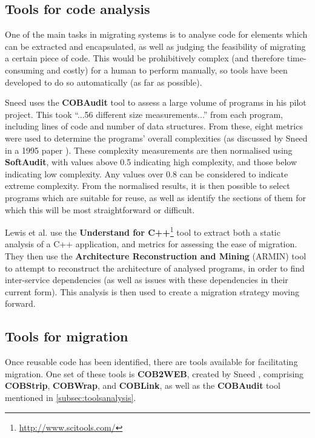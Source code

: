 \documentclass[12pt,journal,compsoc]{IEEEtran}
\begin{document}
\subsection{Tools for code analysis}
\label{subsec:toolsanalysis}
One of the main tasks in migrating systems is to analyse code for elements which can be extracted and encapsulated, as well as judging the feasibility of migrating a certain piece of code. This would be prohibitively complex (and therefore time-consuming and costly) for a human to perform manually, so tools have been developed to do so automatically (as far as possible).

Sneed \cite{Sneed2009} uses the \textbf{COBAudit} tool to assess a large volume of programs in his pilot project. This took ``...56 different size measurements...'' \cite{Sneed2009} from each program, including lines of code and number of data structures. From these, eight metrics were used to determine the programs' overall complexities (as discussed by Sneed in a 1995 paper \cite{Sneed1995}). These complexity measurements are then normalised using \textbf{SoftAudit}, with values above 0.5 indicating high complexity, and those below indicating low complexity. Any values over 0.8 can be considered to indicate extreme complexity. From the normalised results, it is then possible to select programs which are suitable for reuse, as well as identify the sections of them for which this will be most straightforward or difficult.

Lewis et al. \cite{Lewis2005a} use the \textbf{Understand for C++}\footnote{\url{http://www.scitools.com/}} tool to extract both a static analysis of a C++ application, and metrics for assessing the ease of migration. They then use the \textbf{Architecture Reconstruction and Mining} (ARMIN) \cite{O'Brien2005} tool to attempt to reconstruct the architecture of analysed programs, in order to find inter-service dependencies (as well as issues with these dependencies in their current form). This analysis is then used to create a migration strategy moving forward.

\subsection{Tools for migration}
\label{subsec:toolsmigration}
Once reusable code has been identified, there are tools available for facilitating migration. One set of these tools is \textbf{COB2WEB}, created by Sneed \cite{Sneed2008}, comprising \textbf{COBStrip}, \textbf{COBWrap}, and \textbf{COBLink}, as well as the \textbf{COBAudit} tool mentioned in \autoref{subsec:toolsanalysis}.
\end{document}
